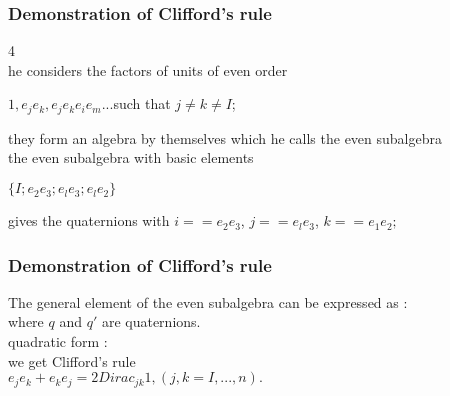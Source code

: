 \begin{frame}\frametitle{Demonstration of Clifford’s rule }
4\\



he considers the factors of units of even order

\begin{center}
	$1, e_j e_k, e_j e_k e_i e_m...$such that $j \neq k \neq I$;
\end{center}
they form an algebra by themselves which he calls the even subalgebra \\

the even subalgebra with basic elements 
\begin{center}
	$\{I; e_2 e_3; e_l e_3; e_l e_2\}$
\end{center}
 gives the quaternions with $i == e_2 e_3$, $j == e_l e_3$, $k == e_1 e_2;$





\end{frame}
\begin{frame}\frametitle{Demonstration of Clifford’s rule }

The general element of the even subalgebra can be expressed as :\\


where $q$ and $q'$ are quaternions. \\

quadratic form :\\




we get Clifford's rule \\
$e_j e_k + e_k e_j = 2 Dirac_{jk} 1 , (j,k=I, ... ,n).$


\end{frame}